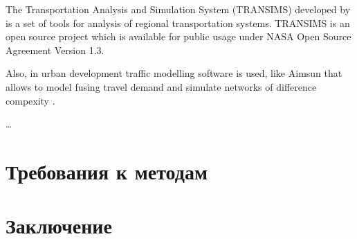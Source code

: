 The Transportation Analysis and Simulation System (TRANSIMS) developed by \cite{transims} is a set of 
tools for analysis of regional transportation systems. TRANSIMS is an open source project which is 
available for public usage under NASA Open Source Agreement Version 1.3.
 
Also, in urban development traffic modelling software is used, like Aimsun that allows to model fusing 
travel demand and simulate networks of difference compexity \cite{aimsun}.

\ldots

\section{Требования к методам}
\section{Заключение}